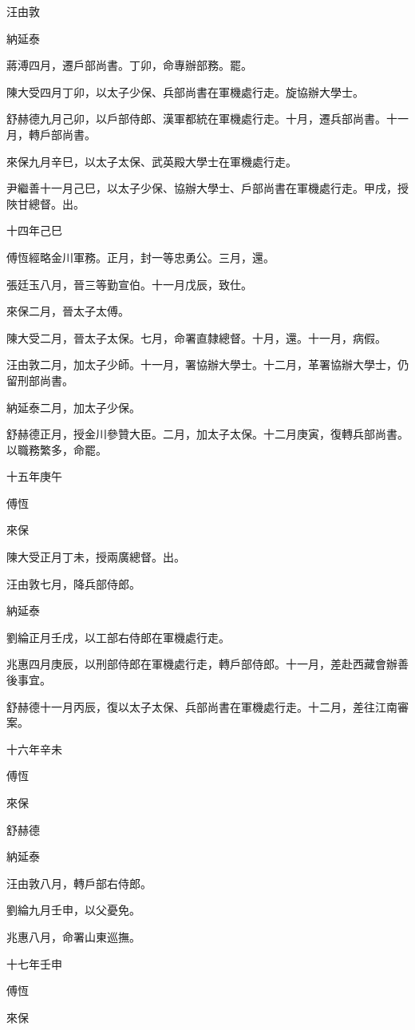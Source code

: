 \begin{pinyinscope}
汪由敦

納延泰

蔣溥四月，遷戶部尚書。丁卯，命專辦部務。罷。

陳大受四月丁卯，以太子少保、兵部尚書在軍機處行走。旋協辦大學士。

舒赫德九月己卯，以戶部侍郎、漢軍都統在軍機處行走。十月，遷兵部尚書。十一月，轉戶部尚書。

來保九月辛巳，以太子太保、武英殿大學士在軍機處行走。

尹繼善十一月己巳，以太子少保、協辦大學士、戶部尚書在軍機處行走。甲戌，授陜甘總督。出。

十四年己巳

傅恆經略金川軍務。正月，封一等忠勇公。三月，還。

張廷玉八月，晉三等勤宣伯。十一月戊辰，致仕。

來保二月，晉太子太傅。

陳大受二月，晉太子太保。七月，命署直隸總督。十月，還。十一月，病假。

汪由敦二月，加太子少師。十一月，署協辦大學士。十二月，革署協辦大學士，仍留刑部尚書。

納延泰二月，加太子少保。

舒赫德正月，授金川參贊大臣。二月，加太子太保。十二月庚寅，復轉兵部尚書。以職務繁多，命罷。

十五年庚午

傅恆

來保

陳大受正月丁未，授兩廣總督。出。

汪由敦七月，降兵部侍郎。

納延泰

劉綸正月壬戌，以工部右侍郎在軍機處行走。

兆惠四月庚辰，以刑部侍郎在軍機處行走，轉戶部侍郎。十一月，差赴西藏會辦善後事宜。

舒赫德十一月丙辰，復以太子太保、兵部尚書在軍機處行走。十二月，差往江南審案。

十六年辛未

傅恆

來保

舒赫德

納延泰

汪由敦八月，轉戶部右侍郎。

劉綸九月壬申，以父憂免。

兆惠八月，命署山東巡撫。

十七年壬申

傅恆

來保


\end{pinyinscope}
